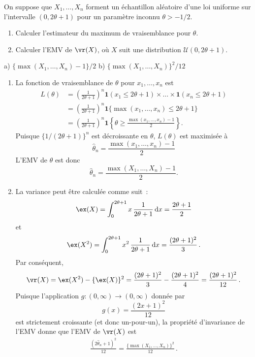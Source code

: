 \begin{exercice}
On suppose que $X_1, \ldots, X_n$ forment un échantillon aléatoire d'une loi uniforme sur l'intervalle $(0, 2\theta +1)$ pour un paramètre inconnu $\theta > -1/2$.
\begin{enumerate}
\item Calculer l'estimateur du maximum de vraisemblance pour $\theta$.
\item Calculer l'EMV de $\vr (X)$, où $X$ suit une distribution $\mathcal{U}(0, 2\theta+1)$.
\end{enumerate}
\begin{rep}
a) $\{\max(X_1,\dots,X_n) -1\}/2$
b) $\{\max(X_1,\dots,X_n)\}^2/12$
\end{rep}

\begin{sol}
\begin{enumerate}
\item La fonction de vraisemblance de $\theta$ pour $x_1,\dots, x_n$ est 
\begin{align*}
L(\theta) &= \left(\frac{1}{2 \theta + 1}\right)^n \boldsymbol{1}(x_1 \le 2 \theta + 1) \times \dots \times\boldsymbol{1}(x_n \le 2 \theta + 1)\\
& = \left(\frac{1}{2 \theta + 1}\right)^n \boldsymbol{1}\{\max(x_1,\dots,x_n) \le 2 \theta + 1\}\\
& = \left(\frac{1}{2 \theta + 1}\right)^n \boldsymbol{1}\left\{  \theta \ge \frac{\max(x_1,\dots,x_n) -1}{2}\right\}.
\end{align*}
Puisque $\{1/(2\theta+1)\}^n$ est décroissante en $\theta$, $L(\theta)$ est maximisée à 
$$
\hat \theta_n = \frac{\max(x_1,\dots,x_n) -1}{2}
$$
L'EMV de $\theta$ est donc
$$
\hat \theta_n = \frac{\max(X_1,\dots,X_n) -1}{2}.
$$

\item La variance peut être calculée comme suit~:
$$
\ex(X) = \int_0^{2\theta  +1} x \, \frac{1}{2\theta + 1} \, \mbox{d} x = \frac{2 \theta  +1}{2} 
$$
et
$$
\ex(X^2) =  \int_0^{2\theta  +1} x^2 \, \frac{1}{2\theta + 1} \, \mbox{d}x = \frac{(2\theta + 1)^2}{3} \, .
$$
Par conséquent,
$$
\vr(X) = \ex(X^2) - \{\ex(X)\}^2 = \frac{(2\theta + 1)^2}{3}- \frac{(2\theta + 1)^2}{4} = \frac{(2\theta + 1)^2}{12} \, .
$$
Puisque l'application $g : (0,\infty) \to (0,\infty)$ donnée par
$$
g(x) = \frac{(2x + 1)^2}{12}
$$
est strictement croissante (et donc un-pour-un), la propriété d'invariance de l'EMV donne que l'EMV de $\vr(X)$ est
\begin{align*}
\frac{(2\hat\theta_n + 1)^2}{12} = \frac{\{\max(X_1,\dots,X_n)\}^2}{12} \, .
\end{align*}

\end{enumerate}
\end{sol}
\end{exercice}


